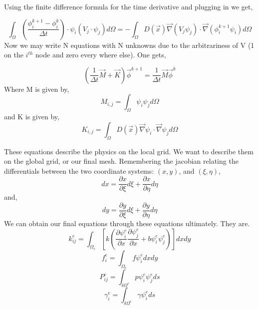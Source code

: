 \documentclass{article}
\begin{document}
Using the finite difference formula for the time derivative and plugging in we get,

 \begin{equation} 
\int_{\Omega} \left(\frac{\phi_{i}^{k+1}-\phi_{i}^{k}}{\Delta t}\right)\cdot \psi_{i} (V_{j}\cdot \psi_{j })d\Omega = -\int_{\Omega}D(\vec{x})\vec{\nabla}(V_{j}\psi_{j}) \cdot\vec{\nabla} (\phi_{i}^{k+1}\psi_{i}) d\Omega
\end{equation}
Now we may write N equations with N unknowns due to the arbitrariness of V (1 on the $i^{th}$ node and zero every where else). One gets,

\begin{equation}
\left(\frac{1}{\Delta t}\vec{M}+\vec{K}\right)\vec{\phi}^{k+1}=\frac{1}{\Delta t}\vec{M}\vec{\phi}^{k}
\end{equation}
Where M is given by,
\begin{equation}
M_{i,j}=\int_{\Omega}\psi_{i}\psi_{j}d\Omega
\end{equation}
and K is given by,
\begin{equation}
K_{i,j}=\int_{\Omega}D(\vec{x})\vec{\nabla}\psi_{i}\cdot \vec{\nabla}\psi_{j}d\Omega
\end{equation}

These equations describe the physics on the local grid. We want to describe them on the global grid, or our final mesh. Remembering the jacobian relating the differentials between the two coordinate systems: $(x,y)$, and $(\xi,\eta)$,
\begin{equation}
dx=\frac{\partial x}{\partial \xi}d \xi + \frac{\partial x}{\partial \eta}d \eta
\end{equation}
and,
\begin{equation}
dy=\frac{\partial y}{\partial \xi}d \xi + \frac{\partial y}{\partial \eta}d \eta
\end{equation}
We can obtain our final equations through these equations ultimately. They are.
\begin{equation}
k_{ij}^e=\int_{\Omega_e}\left[ k\left( \frac{\partial \psi_i^e}{\partial x}\frac{\partial \psi_j^e}{\partial x} + b\psi_i^e \psi_j^e  \right) \right]dxdy
\end{equation}
\begin{equation}
f_i^e=\int_{\Omega_e}f\psi_i^edxdy
\end{equation}
\begin{equation}
P_{ij}^e=\int_{\delta \Omega^e}p\psi_i^e\psi_j^e ds
\end{equation}
\begin{equation}
\gamma_i^e = \int_{\delta \Omega^e} \gamma \psi_i^e ds
\end{equation}
\end{document}
